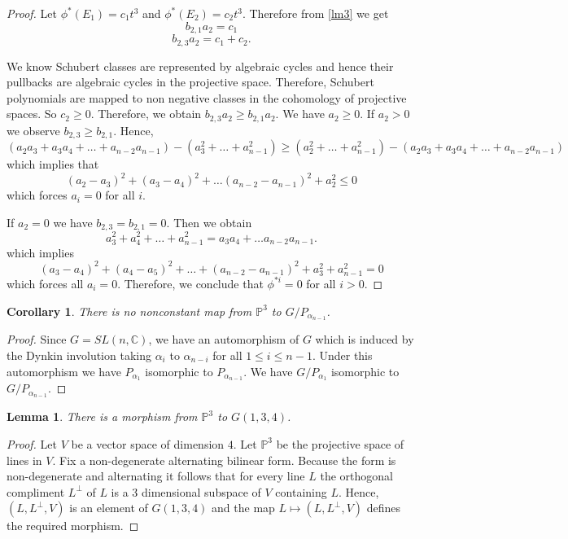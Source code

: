 \documentclass[a4paper,11pt]{amsart}
\newtheorem{corollary}[theorem]{Corollary}
\newtheorem{lemma}[theorem]{Lemma}
\begin{document}
\begin{proof}
Let $\phi^{*}(E_1) = c_1t^3$ and $\phi^{*}(E_2) = c_2t^3$. Therefore from \ref{lm3} we get 
\[ b_{2,1} a_2 = c_1 \] 
\[ b_{2,3 }a_2 = c_1 + c_2 .\]

We know Schubert classes are represented by algebraic cycles and hence their pullbacks are algebraic cycles in the projective space. Therefore, Schubert polynomials are mapped to non negative classes in the cohomology of projective spaces. So $c_2 \geq 0$. Therefore, we obtain $b_{2,3 }a_2 \geq b_{2,1}a_2$. We have $a_2 \geq 0$. If $a_2 >0 $ we observe $b_{2,3 } \geq b_{2,1}$. Hence, 
\[ (a_2a_3 + a_3a_4 + \ldots + a_{n-2}a_{n-1}) - (a_{3}^2 + \ldots + a_{n-1}^2) \geq (a_{2}^2 + \ldots + a_{n-1}^2) - (a_2a_3 + a_3a_4 + \ldots + a_{n-2}a_{n-1})  
\] which implies that 
\[ (a_2- a_3)^2 + (a_3-a_4)^2 + \ldots (a_{n-2} - a_{n-1})^2 + a_{2}^2 \leq 0
\] which forces $a_i = 0$ for all $i$.

If $a_2 = 0$ we have $b_{2,3} = b_{2,1} = 0$. Then we obtain 
\[ a_{3}^2 + a_{4}^2 + \ldots + a_{n-1}^2  = a_{3}a_{4} + \ldots a_{n-2}a_{n-1}. 
\]
which implies 
\[ (a_3-a_4)^2 + (a_4 - a_5)^2 + \ldots + (a_{n-2} - a_{n-1})^2 + a_{3}^2 + a_{n-1}^2 =  0
\] which forces all $a_i = 0$.
Therefore, we conclude that $\phi^{*i} =0$ for all $i > 0$.
\end{proof}

\begin{corollary} There is no nonconstant map from $\mathbb{P}^3$ to $G/{P_{\alpha_{n-1}}}$. 
\end{corollary}

\begin{proof} 

Since $G= SL(n,\mathbb{C})$, we have an automorphism of $G$ which is induced by the Dynkin involution taking $\alpha_i$ to $\alpha_{n-i}$ for all $ 1\leq i \leq n-1$. Under this automorphism we have $P_{\alpha_1}$ isomorphic to $P_{\alpha_{n-1}}$. We have $G/P_{\alpha_1}$ isomorphic to $G/P_{\alpha_{n-1}}$.

\end{proof}


\begin{lemma} \label{p3tog134}
 There is a morphism from $\mathbb{P}^3$ to $G(1,3,4)$. 
\end{lemma}

\begin{proof}
Let $V$ be a vector space of dimension $4$. Let $\mathbb{P}^3$ be the projective space of lines in $V$. Fix a non-degenerate alternating bilinear form. Because the form is non-degenerate and alternating it follows that for every line $L$ the orthogonal compliment $L^{\perp}$ of $L$ is a $3$ dimensional subspace of $V$ containing $L$. Hence, $(L,L^{\perp}, V)$ is an element of $G(1,3,4)$ and the map $L \mapsto (L,L^{\perp}, V)$ defines the required morphism.
\end{proof}
\end{document}
